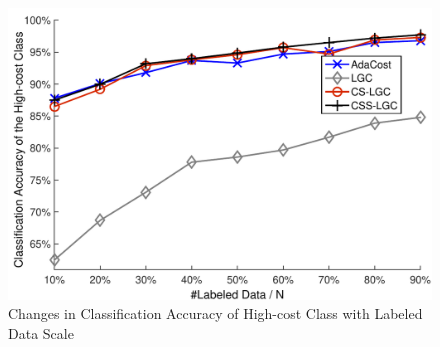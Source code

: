\documentclass{svjour3}                     %
\begin{document}


\begin{figure}[ht]
\includegraphics[width=\textwidth]{plot/fig7.pdf}
\caption{Changes in Classification Accuracy of High-cost Class with Labeled Data Scale} \label{fig7}
\end{figure}

\end{document}
